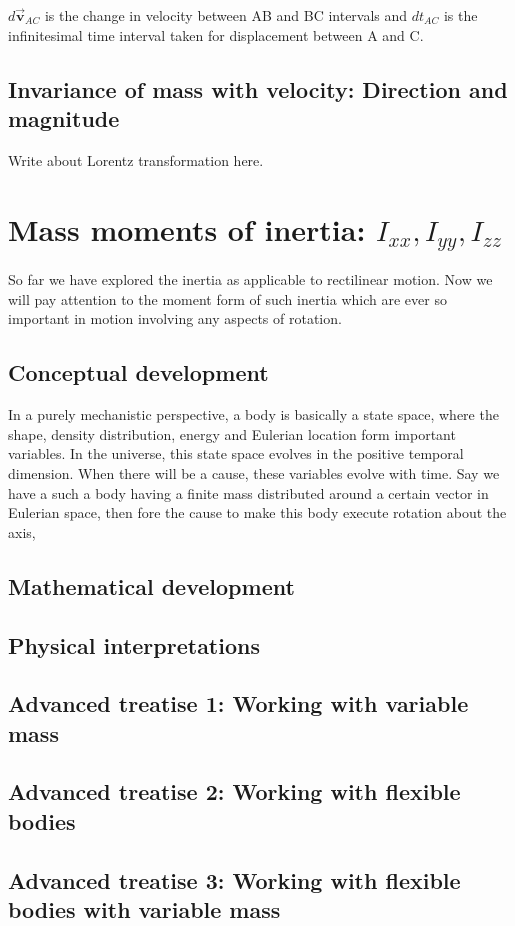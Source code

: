 \begin{flushright}
\begin{minipage}[h]{10.5cm}
{$d\vec{\mathbf{v}}_{AC}$ is the change in velocity between AB and BC intervals and $dt_{AC}$ is the infinitesimal time interval taken for displacement between A and C.
}
\end{minipage}
\end{flushright}

\subsection{Invariance of mass with velocity: Direction and magnitude}
Write about Lorentz transformation here.

\section{Mass moments of inertia: $I_{xx}, I_{yy}, I_{zz}$}
So far we have explored the inertia as applicable to rectilinear motion. Now we will pay attention to the moment form of such inertia which are ever so important in motion involving any aspects of rotation.
\subsection{Conceptual development}
In a purely mechanistic perspective, a body is basically a state space, where the shape, density distribution, energy and Eulerian location form important variables. In the universe, this state space evolves in the positive temporal dimension. When there will be a cause, these variables evolve with time. Say we have a such a body having a finite mass distributed around a certain vector in Eulerian space, then fore the cause to make this body execute rotation about the axis, 
\subsection{Mathematical development}
\subsection{Physical interpretations}
\subsection{Advanced treatise 1: Working with variable mass}
\subsection{Advanced treatise 2: Working with flexible bodies}
\subsection{Advanced treatise 3: Working with flexible bodies with variable mass}


